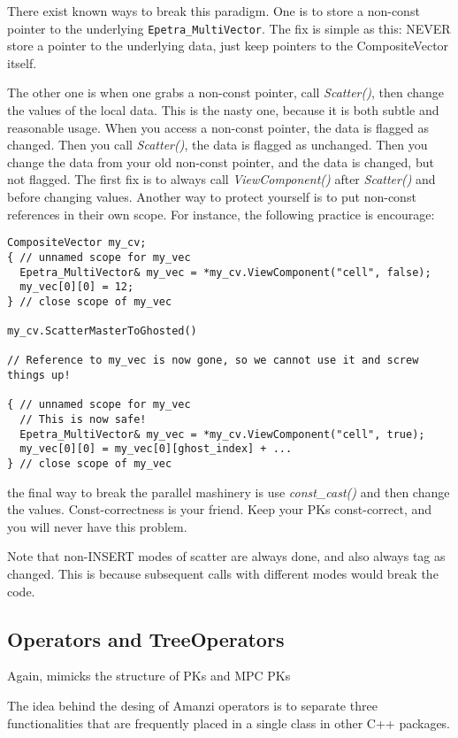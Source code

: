 There exist known ways to break this paradigm. 
One is to store a non-const pointer to the underlying {\tt Epetra\_MultiVector}.
The fix is simple as this: NEVER store a pointer to the underlying data, 
just keep pointers to the CompositeVector itself.

The other one is when one grabs a non-const pointer, call {\it Scatter()}, then 
change the values of the local data.  
This is the nasty one, because it is both subtle and reasonable usage.
When you access a non-const pointer, the data is flagged as changed.
Then you call {\it Scatter()}, the data is flagged as unchanged.
Then you change the data from your old non-const pointer, and the data is changed, but not flagged.
The first fix is to always call {\it ViewComponent()} after {\it Scatter()} and before changing values.
Another way to protect yourself is to put non-const references in their own scope.
For instance, the following practice is encourage:
\begin{lstlisting}
CompositeVector my_cv;
{ // unnamed scope for my_vec
  Epetra_MultiVector& my_vec = *my_cv.ViewComponent("cell", false);
  my_vec[0][0] = 12;
} // close scope of my_vec

my_cv.ScatterMasterToGhosted()

// Reference to my_vec is now gone, so we cannot use it and screw things up!

{ // unnamed scope for my_vec
  // This is now safe!
  Epetra_MultiVector& my_vec = *my_cv.ViewComponent("cell", true);
  my_vec[0][0] = my_vec[0][ghost_index] + ...
} // close scope of my_vec
\end{lstlisting}

the final way to break the parallel mashinery is use {\it const\_cast()} and 
then change the values.
Const-correctness is your friend. Keep your PKs const-correct, and you will never have this problem.

Note that non-INSERT modes of scatter are always done, and also always tag as changed.  
This is because subsequent calls with different modes would break the code.


\subsection{Operators and TreeOperators}

Again, mimicks the structure of PKs and MPC PKs

The idea behind the desing of Amanzi operators is to separate three 
functionalities that are frequently placed in a single class in other
C++ packages.

